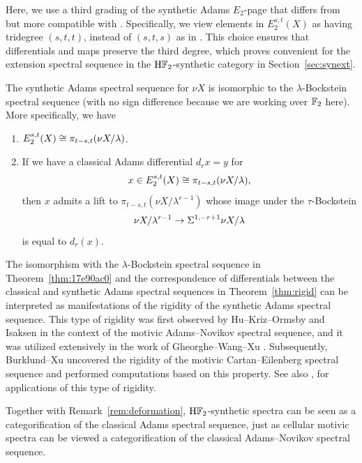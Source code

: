 \documentclass{amsart}
\numberwithin{equation}{section}
\newcommand{\HF}{\mathrm{H}\bF_2}
\begin{document}
\begin{remark}
    Here, we use a third grading of the synthetic Adams $E_2$-page that differs from \cite{BHS} but more compatible with \cite{BurklundIsaksenXu}. Specifically, we view elements in $E_2^{s,t}(X)$ as having tridegree $(s,t,t)$, instead of $(s,t,s)$ as in \cite{BHS}. This choice ensures that differentials and maps preserve the third degree, which proves convenient for the extension spectral sequence in the $\HF$-synthetic category in Section~\ref{sec:synext}.
\end{remark}

\begin{theorem}\label{thm:17e90ac0}
    The synthetic Adams spectral sequence for $\nu X$ is isomorphic to the $\lambda$-Bockstein spectral sequence (with no sign difference because we are working over ${\mathbb F}_2$ here). More specifically, we have
    \begin{enumerate}
        \item $E_2^{s,t}(X)\cong \pi_{t-s,t}(\nu X /\lambda)$.
        \item If we have a classical Adams differential $d_rx=y$ for 
        $$x\in E_2^{s,t}(X)\cong \pi_{t-s,t}(\nu X /\lambda),$$
        then $x$ admits a lift to $\pi_{t-s,t}(\nu X/\lambda^{r-1})$ whose image under the $\tau$-Bockstein
        $$\nu X/\lambda^{r-1}\to \Sigma^{1,-r+1}\nu X/\lambda$$
        is equal to $d_r(x)$.
    \end{enumerate}
\end{theorem}

\begin{remark}
    The isomorphism with the $\lambda$-Bockstein spectral sequence in Theorem~\ref{thm:17e90ac0} and the correspondence of differentials between the classical and synthetic Adams spectral sequences in Theorem~\ref{thm:rigid} can be interpreted as manifestations of the rigidity of the synthetic Adams spectral sequence. This type of rigidity was first observed by Hu--Kriz--Ormsby \cite{HuKrizOrmsby} and Isaksen \cite{Isaksen} in the context of the motivic Adams--Novikov spectral sequence, and it was utilized extensively in the work of Gheorghe--Wang--Xu \cite{GWX}. Subsequently, Burklund--Xu \cite{BurklundXu} uncovered the rigidity of the motivic Cartan--Eilenberg spectral sequence and performed computations based on this property. See also \cite{mmf}, \cite{Burklund} for applications of this type of rigidity.

    Together with Remark~\ref{rem:deformation}, $\HF$-synthetic spectra can be seen as a categorification of the classical Adams spectral sequence, just as cellular motivic spectra can be viewed a categorification of the classical Adams--Novikov spectral sequence.
\end{remark}
\end{document}
